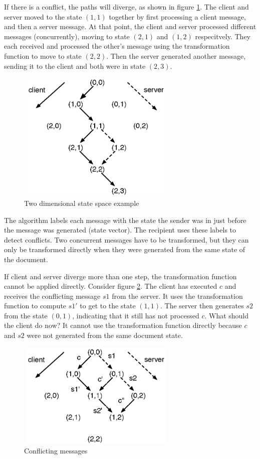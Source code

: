If there is a conflict, the paths will diverge, as shown in figure \ref{jupiter:statespace1}. The client and server moved to the state $(1,1)$ together by first processing a client message, and then a server message. At that point, the client and server processed different messages (concurrently), moving to state $(2,1)$ and $(1,2)$ respecitvely. They each received and processed the other's message using the transformation function to move to state $(2,2)$. Then the server generated another message, sending it to the client and both were in state $(2,3)$.

\begin{figure}[H]
  \centering
  \includegraphics[width=3in,height=2.45in]{../../images/jupiter2.eps}
  \caption{Two dimensional state space example}
  \label{jupiter:statespace1}
\end{figure}

The algorithm labels each message with the state the sender was in just before the message was generated (state vector). The recipient uses these labels to detect conflicts. Two concurrent messages have to be transformed, but they can only be transformed directly when they were generated from the same state of the document. 

If client and server diverge more than one step, the transformation function cannot be applied directly. Consider figure \ref{jupiter:statespace2}. The client has executed $c$ and receives the conflicting message $s1$ from the server. It uses the transformation function to compute $s1'$ to get to the state $(1,1)$. The server then generates $s2$ from the state $(0,1)$, indicating that it still has not processed $c$. What should the client do now? It cannot use the transformation function directly because $c$ and $s2$ were not generated from the same document state.

\begin{figure}[H]
 \centering
 \includegraphics[width=3in,height=2in]{../../images/jupiter.eps}
 \caption{Conflicting messages}
 \label{jupiter:statespace2}
\end{figure}

